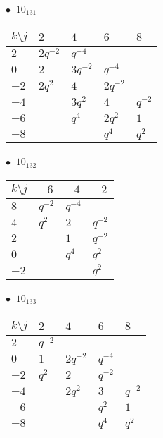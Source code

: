 %
\begin{minipage}{\linewidth}
$\bullet\ $ $10_{131}$ \vspace{0.5em} \\
\begin{tabular}{l|llll}
$k \setminus j$ & $2$ & $4$ & $6$ & $8$ \\
\hline
$2$ & $2q^{-2}$ & $q^{-4}$ &  &  \\
$0$ & $2$ & $3q^{-2}$ & $q^{-4}$ &  \\
$-2$ & $2q^{2}$ & $4$ & $2q^{-2}$ &  \\
$-4$ &  & $3q^{2}$ & $4$ & $q^{-2}$ \\
$-6$ &  & $q^{4}$ & $2q^{2}$ & $1$ \\
$-8$ &  &  & $q^{4}$ & $q^{2}$ \\
\end{tabular}
\vspace{2em}
\end{minipage}
%
\begin{minipage}{\linewidth}
$\bullet\ $ $10_{132}$ \vspace{0.5em} \\
\begin{tabular}{l|lll}
$k \setminus j$ & $-6$ & $-4$ & $-2$ \\
\hline
$8$ & $q^{-2}$ & $q^{-4}$ &  \\
$4$ & $q^{2}$ & $2$ & $q^{-2}$ \\
$2$ &  & $1$ & $q^{-2}$ \\
$0$ &  & $q^{4}$ & $q^{2}$ \\
$-2$ &  &  & $q^{2}$ \\
\end{tabular}
\vspace{2em}
\end{minipage}
%
\begin{minipage}{\linewidth}
$\bullet\ $ $10_{133}$ \vspace{0.5em} \\
\begin{tabular}{l|llll}
$k \setminus j$ & $2$ & $4$ & $6$ & $8$ \\
\hline
$2$ & $q^{-2}$ &  &  &  \\
$0$ & $1$ & $2q^{-2}$ & $q^{-4}$ &  \\
$-2$ & $q^{2}$ & $2$ & $q^{-2}$ &  \\
$-4$ &  & $2q^{2}$ & $3$ & $q^{-2}$ \\
$-6$ &  &  & $q^{2}$ & $1$ \\
$-8$ &  &  & $q^{4}$ & $q^{2}$ \\
\end{tabular}
\vspace{2em}
\end{minipage}
